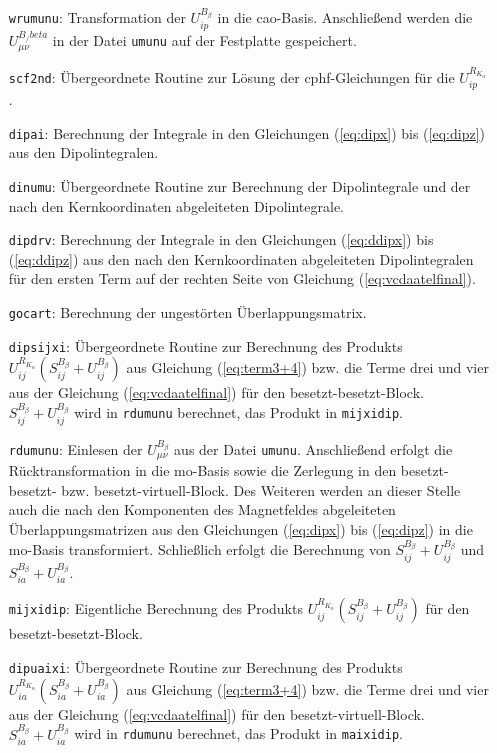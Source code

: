 \begin{itemize}
	\item[\texttt{wrumunu}:] Transformation der $U_{ip}^{B_\beta}$ in die \ac{cao}-Basis. Anschließend werden die $U_{\mu\nu}^{B_/beta}$ in der Datei \texttt{umunu} auf der Festplatte gespeichert.
	\item[\texttt{scf2nd}:] Übergeordnete Routine zur Lösung der \ac{cphf}-Gleichungen für die $U_{ip}^{R_{K_\alpha}}$.
	\item[\texttt{dipai}:] Berechnung der Integrale in den Gleichungen (\ref{eq:dipx}) bis (\ref{eq:dipz}) aus den Dipolintegralen.
	\item[\texttt{dinumu}:] Übergeordnete Routine zur Berechnung der Dipolintegrale und der nach den Kernkoordinaten abgeleiteten Dipolintegrale.
	\item[\texttt{dipdrv}:] Berechnung der Integrale in den Gleichungen (\ref{eq:ddipx}) bis (\ref{eq:ddipz}) aus den nach den Kernkoordinaten abgeleiteten Dipolintegralen für den ersten Term auf der rechten Seite von Gleichung (\ref{eq:vcdaatelfinal}).
	\item[\texttt{gocart}:] Berechnung der ungestörten Überlappungsmatrix.
	\item[\texttt{dipsijxi}:] Übergeordnete Routine zur Berechnung des Produkts $U_{ij}^{R_{K_\alpha}}\left(S_{ij}^{B_\beta}+U_{ij}^{B_\beta}\right)$ aus Gleichung (\ref{eq:term3+4}) bzw. die Terme drei und vier aus der Gleichung (\ref{eq:vcdaatelfinal}) für den besetzt-besetzt-Block. $S_{ij}^{B_\beta}+U_{ij}^{B_\beta}$ wird in \texttt{rdumunu} berechnet, das Produkt in \texttt{mijxidip}.
	\item[\texttt{rdumunu}:] Einlesen der $U_{\mu\nu}^{B_\beta}$ aus der Datei \texttt{umunu}. Anschließend erfolgt die Rücktransformation in die \ac{mo}-Basis sowie die Zerlegung in den besetzt-besetzt- bzw. besetzt-virtuell-Block. Des Weiteren werden an dieser Stelle auch die nach den Komponenten des Magnetfeldes abgeleiteten Überlappungsmatrizen aus den Gleichungen (\ref{eq:dipx}) bis (\ref{eq:dipz}) in die \ac{mo}-Basis transformiert. Schließlich erfolgt die Berechnung von $S_{ij}^{B_\beta}+U_{ij}^{B_\beta}$ und $S_{ia}^{B_\beta}+U_{ia}^{B_\beta}$.
	\item[\texttt{mijxidip}:] Eigentliche Berechnung des Produkts $U_{ij}^{R_{K_\alpha}}\left(S_{ij}^{B_\beta}+U_{ij}^{B_\beta}\right)$ für den besetzt-besetzt-Block.
	\item[\texttt{dipuaixi}:] Übergeordnete Routine zur Berechnung des Produkts $U_{ia}^{R_{K_\alpha}}\left(S_{ia}^{B_\beta}+U_{ia}^{B_\beta}\right)$ aus Gleichung (\ref{eq:term3+4}) bzw. die Terme drei und vier aus der Gleichung (\ref{eq:vcdaatelfinal}) für den besetzt-virtuell-Block. $S_{ia}^{B_\beta}+U_{ia}^{B_\beta}$ wird in \texttt{rdumunu} berechnet, das Produkt in \texttt{maixidip}.

\end{itemize}
